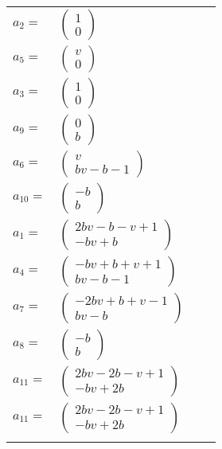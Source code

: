 \documentclass[1p]{elsarticle_modified}
\theoremstyle{definition}
\begin{document}
\begin{tabular}{m{7pt} m{180pt} m{7pt} m{180pt} }
\flushright $a_{2}=$&$\begin{pmatrix}1\\0\end{pmatrix}$ \\
\flushright $a_{5}=$&$\begin{pmatrix}v\\0\end{pmatrix}$ \\
\flushright $a_{3}=$&$\begin{pmatrix}1\\0\end{pmatrix}$ \\
\flushright $a_{9}=$&$\begin{pmatrix}0\\b\end{pmatrix}$ \\
\flushright $a_{6}=$&$\begin{pmatrix}v\\b v- b-1\end{pmatrix}$ \\
\flushright $a_{10}=$&$\begin{pmatrix}- b\\b\end{pmatrix}$ \\
\flushright $a_{1}=$&$\begin{pmatrix}2 b v- b- v+1\\- b v+b\end{pmatrix}$ \\
\flushright $a_{4}=$&$\begin{pmatrix}- b v+b+v+1\\b v- b-1\end{pmatrix}$ \\
\flushright $a_{7}=$&$\begin{pmatrix}-2 b v+b+v-1\\b v- b\end{pmatrix}$ \\
\flushright $a_{8}=$&$\begin{pmatrix}- b\\b\end{pmatrix}$ \\
\flushright $a_{11}=$&$\begin{pmatrix}2 b v-2 b- v+1\\- b v+2 b\end{pmatrix}$\\ \flushright $a_{11}=$&$\begin{pmatrix}2 b v-2 b- v+1\\- b v+2 b\end{pmatrix}$\\&\end{tabular}
\end{document}
